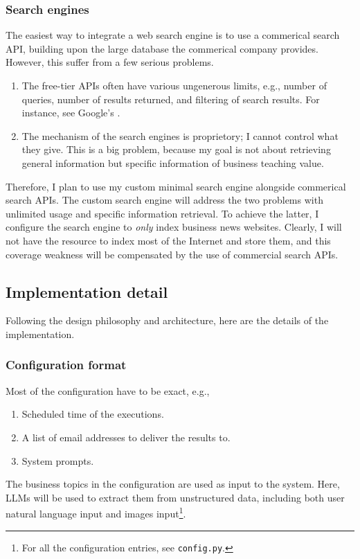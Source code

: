\documentclass[final-report]{report-template}
\begin{document}
\subsubsection{Search engines} \label{sec.custom.search.engine}
The easiest way to integrate a web search engine is to use a commerical search
API, building upon the large database the commerical company provides.
However, this suffer from a few serious problems.
\begin{enumerate}
	\item 
	The free-tier APIs often have various ungenerous limits, e.g., number of
	queries, number of results returned, and filtering of search results.  For
	instance, see Google's \cite{search.api.limit.1}.
	\item
	The mechanism of the search engines is proprietory; I cannot control what
	they give. This is a big problem, because my goal is not about retrieving
	general information but specific information of business teaching value.
\end{enumerate}

Therefore, I plan to use my custom minimal search engine alongside commerical
search APIs. The custom search engine will address the two problems with
unlimited usage and specific information retrieval. To achieve the latter, I
configure the search engine to \emph{only} index business news websites.
Clearly, I will not have the resource to index most of the Internet and store
them, and this coverage weakness will be compensated by the use of commercial
search APIs.

\subsection{Implementation detail}
Following the design philosophy and architecture, here are the details of the
implementation.

\subsubsection{Configuration format} 
Most of the configuration have to be exact, e.g.,
\begin{enumerate}
	\item Scheduled time of the executions.
	\item A list of email addresses to deliver the results to.
	\item System prompts.
\end{enumerate}

The business topics in the configuration are used as input to the system.
Here, LLMs will be used to extract them from unstructured data, including both
user natural language input and images input\footnote{For all the configuration
entries, see \texttt{config.py}.}.
\end{document}
